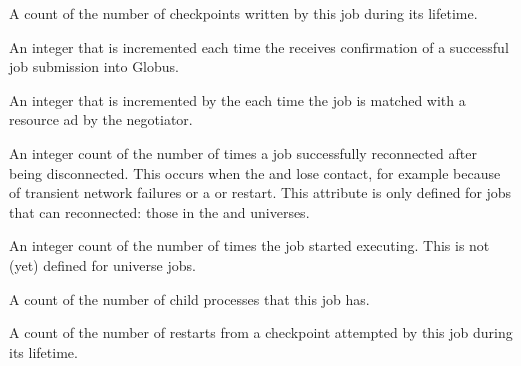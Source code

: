 \begin{description}
\item[\AdAttr{NumCkpts}:]  A count of the number of checkpoints
written by this job during its lifetime.

\item[\AdAttr{NumGlobusSubmits}:]   An integer that is incremented each
time the  receives confirmation of a successful job
submission into Globus.

\item[\AdAttr{NumJobMatches}:]  An integer that is incremented by the
 each time the job is matched with a resource ad by the
negotiator.

\item[\AdAttr{NumJobReconnects}:]  An integer count of the number of times a
  job successfully reconnected after being disconnected.
  This occurs when the
   and  lose contact,
  for example because of
  transient network failures or a  or 
  restart.
  This attribute is only defined for jobs that can reconnected:
  those in the  and  universes.

\item[\AdAttr{NumJobStarts}:]  An integer count of the number of times the
  job started executing.
  This is not (yet) defined for  universe jobs.

\item[\AdAttr{NumPids}:]  A count of the number of child processes that
this job has.

\item[\AdAttr{NumRestarts}:]  A count of the number of restarts from a
checkpoint attempted by this job during its lifetime.


\end{description}
